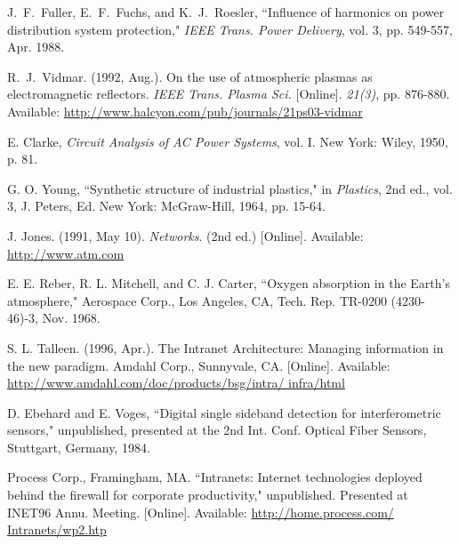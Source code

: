 \documentclass[conference]{IEEEtran}
\begin{document}
%
%
%
\begin{thebibliography}{16}

J.~F.~Fuller, E.~F.~Fuchs, and K.~J.~Roesler, ``Influence of harmonics on power distribution system protection," \emph{IEEE Trans. Power Delivery}, vol. 3, pp. 549-557, Apr. 1988.

R.~J.~Vidmar. (1992, Aug.). On the use of atmospheric plasmas as electromagnetic reflectors. \emph{IEEE Trans. Plasma Sci.} [Online]. \emph{21(3)}, pp. 876-880. Available: \url{http://www.halcyon.com/pub/journals/21ps03-vidmar}

E. Clarke, \emph{Circuit Analysis of AC Power Systems}, vol. I.  New York: Wiley, 1950, p. 81.

G. O. Young, ``Synthetic structure of industrial plastics," in \emph{Plastics}, 2nd ed., vol. 3, J. Peters, Ed.  New York: McGraw-Hill, 1964, pp. 15-64.

J. Jones. (1991, May 10). \emph{Networks}. (2nd ed.) [Online]. Available: \url{http://www.atm.com}

E. E. Reber, R. L. Mitchell, and C. J. Carter, ``Oxygen absorption in the Earth's atmosphere," Aerospace Corp., Los Angeles, CA, Tech. Rep. TR-0200 (4230-46)-3, Nov. 1968.

S. L. Talleen. (1996, Apr.). The Intranet Architecture: Managing information in the new paradigm. Amdahl Corp., Sunnyvale, CA. [Online]. Available: \url{http://www.amdahl.com/doc/products/bsg/intra/ infra/html}

D. Ebehard and E. Voges, ``Digital single sideband detection for interferometric sensors," unpublished, presented at the 2nd Int. Conf. Optical Fiber Sensors, Stuttgart, Germany, 1984.

Process Corp., Framingham, MA. ``Intranets: Internet technologies deployed behind the firewall for corporate productivity," unpublished. Presented at INET96 Annu. Meeting. [Online]. Available: \url{http://home.process.com/ Intranets/wp2.htp}


\end{thebibliography}
\end{document}
